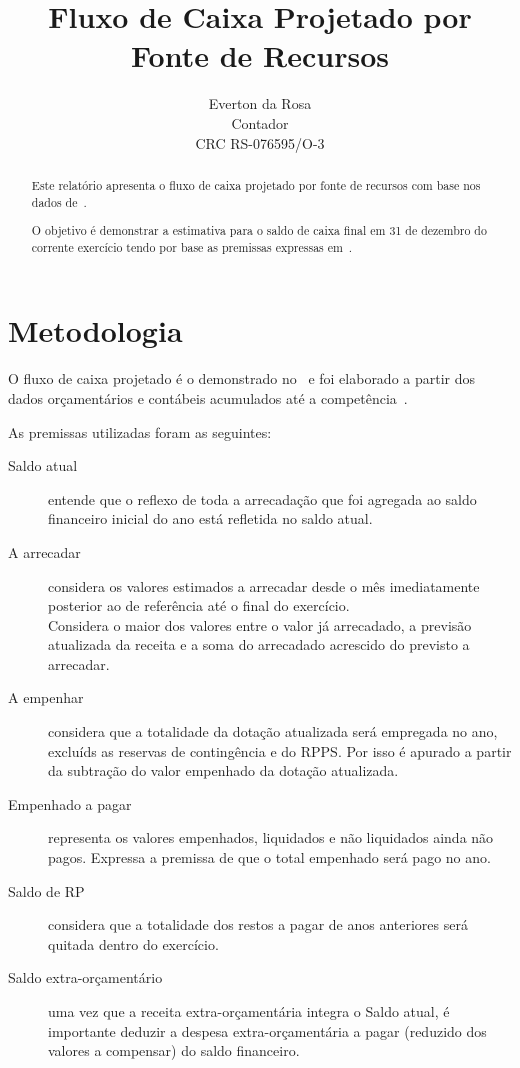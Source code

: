 \documentclass[12pt, a4paper]{report}
\title{Fluxo de Caixa Projetado por Fonte de Recursos}
\author{
	Everton da Rosa\\
	Contador\\
	CRC RS-076595/O-3
}
\begin{document}
\maketitle

\begin{abstract}

Este relatório apresenta o fluxo de caixa projetado por fonte de recursos com base nos dados de~\thedate.

O objetivo é demonstrar a estimativa para o saldo de caixa final em 31 de dezembro do corrente exercício tendo por base as premissas expressas em~.

\end{abstract}




\chapter*{Metodologia} \label{ch:metodologia}

O fluxo de caixa projetado é o demonstrado no~ e foi elaborado a partir dos dados orçamentários e contábeis acumulados até a competência~\thedate.

As premissas utilizadas foram as seguintes:

\begin{description}
\item[Saldo atual] entende que o reflexo de toda a arrecadação que foi agregada ao saldo financeiro inicial do ano está refletida no saldo atual.

\item[A arrecadar] considera os valores estimados a arrecadar desde o mês imediatamente posterior ao de referência até o final do exercício.\\Considera o maior dos valores entre o valor já arrecadado, a previsão atualizada da receita e a soma do arrecadado acrescido do previsto a arrecadar.

\item[A empenhar] considera que a totalidade da dotação atualizada será empregada no ano, excluíds as reservas de contingência e do RPPS. Por isso é apurado a partir da subtração do valor empenhado da dotação atualizada.

\item[Empenhado a pagar] representa os valores empenhados, liquidados e não liquidados ainda não pagos. Expressa a premissa de que o total empenhado será pago no ano.

\item[Saldo de RP] considera que a totalidade dos restos a pagar de anos anteriores será quitada dentro do exercício.

\item[Saldo extra-orçamentário] uma vez que a receita extra-orçamentária integra o Saldo atual, é importante deduzir a despesa extra-orçamentária a pagar (reduzido dos valores a compensar) do saldo financeiro.
\end{description}
\end{document}
